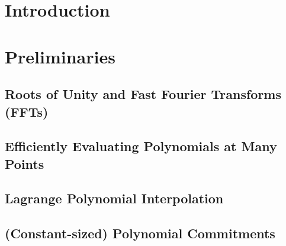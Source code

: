 \documentclass[12pt,twoside,singlespace]{mitthesis}
\begin{document}


% 
\pagestyle{plain}

%
%


\ifCameraReady
\cleardoublepage
\listoffigures
\cleardoublepage
\listoftables
\fi


%
%

    \chapter{Introduction}
    

    \chapter{Preliminaries}
    \label{s:prelim}
    
        
        
        \section{Roots of Unity and Fast Fourier Transforms (FFTs)}
        \label{s:prelim:fft}
        
        
        \section{Efficiently Evaluating Polynomials at Many Points}
        \label{s:prelim:multipoint-eval}
        
        
        \section{Lagrange Polynomial Interpolation}
        \label{s:prelim:interpolation}
        
        
        \section{(Constant-sized) Polynomial Commitments}
        \label{s:prelim:polycommit}
        
        
\end{document}
